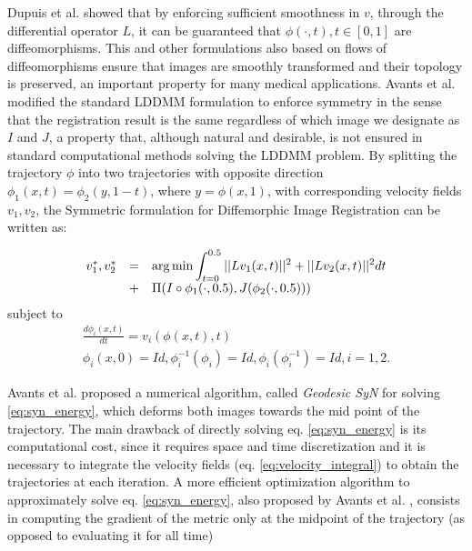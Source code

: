 Dupuis et al. \cite{Dupuis1998} showed that by enforcing sufficient smoothness
in $v$, through the differential operator $L$, it can be guaranteed that $\phi(\cdot, t), t \in [0, 1]$ are diffeomorphisms. This and other formulations also based on flows of
diffeomorphisms ensure that images are smoothly transformed and their topology is preserved, an important property for many medical applications. Avants et al. \cite{Avants2008}
\cite{Avants2011} modified the standard LDDMM formulation to enforce symmetry in the sense that the registration result is the same regardless of which image we designate as $I$
and $J$, a property that, although natural and desirable, is not ensured in standard computational methods solving the LDDMM problem. By splitting the trajectory $\phi$ into two
trajectories with opposite direction $\phi_{1}(x, t) = \phi_{2}(y, 1-t)$, where $y = \phi(x, 1)$, with corresponding velocity fields $v_{1}, v_{2}$, the Symmetric formulation
for Diffemorphic Image Registration \cite{Avants2008}\cite{Avants2011} can be written as:

\begin{equation}\label{eq:syn_energy}
    \begin{array}{lll}
        v_{1}^{*}, v_{2}^{*} &=& \mathlarger{\arg \min \int_{t=0}^{0.5} ||L v_{1}(x, t)||^{2} + ||L v_{2}(x, t)||^{2} dt}\\
        &+& \mathlarger{ \Pi(I \circ \phi_{1}(\cdot, 0.5), J(\phi_{2}(\cdot, 0.5)))}
    \end{array}
\end{equation}
subject to
\begin{equation}\label{eq:syn_energy_constraints}
    \begin{array}{l}
        \frac{d\phi_{i}(x, t)}{dt} = v_{i}(\phi(x,t),t)\\
        \phi_{i}(x, 0) = Id, \phi_{i}^{-1}(\phi_{i}) = Id, \phi_{i}(\phi_{i}^{-1}) = Id, i=1,2.
    \end{array}
\end{equation}

Avants et al. \cite{Avants2006} proposed a numerical algorithm, called \textit{Geodesic SyN} for solving \ref{eq:syn_energy}, which deforms both images towards the mid point of
the trajectory. The main drawback of directly solving eq. \ref{eq:syn_energy} is its computational cost, since it requires space and time discretization and
it is necessary to integrate the velocity fields (eq. \ref{eq:velocity_integral}) to obtain the trajectories at each iteration. A more efficient optimization algorithm
to approximately solve eq. \ref{eq:syn_energy}, also proposed by Avants et al. \cite{Avants2008}\cite{Avants2011}, consists in computing the gradient of the metric only at the
midpoint of the trajectory (as opposed to evaluating it for all time)

